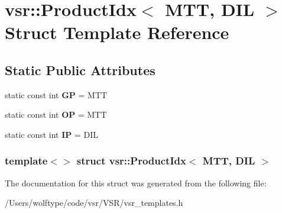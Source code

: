 \hypertarget{structvsr_1_1_product_idx_3_01_m_t_t_00_01_d_i_l_01_4}{\section{vsr\-:\-:Product\-Idx$<$ M\-T\-T, D\-I\-L $>$ Struct Template Reference}
\label{structvsr_1_1_product_idx_3_01_m_t_t_00_01_d_i_l_01_4}
}
\subsection*{Static Public Attributes}
\begin{DoxyCompactItemize}
\item 
\hypertarget{structvsr_1_1_product_idx_3_01_m_t_t_00_01_d_i_l_01_4_a38d6443ee08e3a4718d0733257353c85}{static const int {\bfseries G\-P} = M\-T\-T}\label{structvsr_1_1_product_idx_3_01_m_t_t_00_01_d_i_l_01_4_a38d6443ee08e3a4718d0733257353c85}

\item 
\hypertarget{structvsr_1_1_product_idx_3_01_m_t_t_00_01_d_i_l_01_4_a39e5c82a0cedc1ed08ac5c45d15affcc}{static const int {\bfseries O\-P} = M\-T\-T}\label{structvsr_1_1_product_idx_3_01_m_t_t_00_01_d_i_l_01_4_a39e5c82a0cedc1ed08ac5c45d15affcc}

\item 
\hypertarget{structvsr_1_1_product_idx_3_01_m_t_t_00_01_d_i_l_01_4_a84f631eae7ccee30bdd0caa12f2def32}{static const int {\bfseries I\-P} = D\-I\-L}\label{structvsr_1_1_product_idx_3_01_m_t_t_00_01_d_i_l_01_4_a84f631eae7ccee30bdd0caa12f2def32}

\end{DoxyCompactItemize}
\subsubsection*{template$<$$>$ struct vsr\-::\-Product\-Idx$<$ M\-T\-T, D\-I\-L $>$}



The documentation for this struct was generated from the following file\-:\begin{DoxyCompactItemize}
\item 
/\-Users/wolftype/code/vsr/\-V\-S\-R/vsr\-\_\-templates.\-h\end{DoxyCompactItemize}

